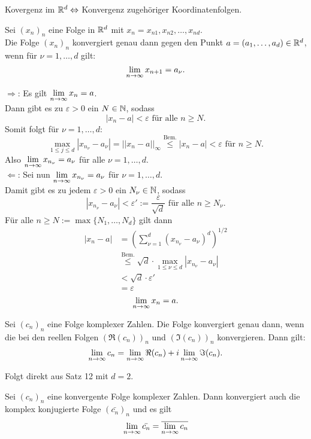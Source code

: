 \documentclass[../ana1.tex]{subfiles}
\begin{document}
Kovergenz im \(\mathbb{R}^d \Leftrightarrow\) Konvergenz zugehöriger Koordinatenfolgen.
\begin{satz}
	Sei \((x_n)_n\) eine Folge in \(\mathbb{R}^d\) mit \(x_n = x_{n1},x_{n2},\dots,x_{nd}\).\\
	Die Folge \((x_n)_n\) konvergiert genau dann gegen den Punkt \(a = (a_1,\dots,a_d)\in\mathbb{R}^d\), wenn für \(\nu = 1,\dots,d\) gilt:
	\[ \lim\limits_{n\rightarrow\infty} x_{n+1} = a_\nu. \]
\end{satz}
\begin{bew}
	\glqq\(\Rightarrow\)\grqq: Es gilt \( \lim\limits_{n\rightarrow\infty}x_n = a \).\\
	Dann gibt es zu \(\varepsilon>0\) ein \(N\in\mathbb{N}\), sodass
	\[ |x_n - a| < \varepsilon \text{ für alle } n\geq N. \]
	Somit folgt für \(\nu = 1,\dots,d\):
	\[ \underset{1\leq j\leq d}{\max} |x_{n_\nu} - a_\nu| = ||x_n - a||_\infty \overset{\text{Bem.}}{\leq} |x_n - a| < \varepsilon \text{ für }n\geq N. \]
	Also \(\lim\limits_{n\rightarrow\infty}x_{n_\nu} = a_\nu\) für alle \(\nu = 1,\dots,d\).\\
	\glqq\(\Leftarrow\)\grqq: Sei nun \( \lim\limits_{n\rightarrow\infty}x_{n_\nu} = a_\nu \) für \(\nu = 1,\dots,d\).\\
	Damit gibt es zu jedem \(\varepsilon>0\) ein \(N_\nu \in\mathbb{N}\), sodass
	\[ |x_{n_\nu} - a_\nu| < \varepsilon' := \frac{\varepsilon}{\sqrt{d}} \text{ für alle } n\geq N_\nu. \]
	Für alle \(n\geq N := \max\{N_1,\dots,N_d\}\) gilt dann
	\begin{align*}
		|x_n - a| &= {\left( \sum_{\nu=1}^{d} (x_{n_\nu} - a_\nu)^d \right)}^{1/2}\\
		&\overset{\text{Bem.}}{\leq} \sqrt{d} \cdot \underset{1\leq \nu\leq d}{\max} |x_{n_\nu} -a_\nu|\\
		&< \sqrt{d} \cdot \varepsilon'\\
		&= \varepsilon
	\end{align*}
	\[ \lim\limits_{n\rightarrow\infty} x_n = a. \]
\end{bew}
\begin{kor}
	Sei \((c_n)_n\) eine Folge komplexer Zahlen. Die Folge konvergiert genau dann, wenn die bei den reellen Folgen \((\Re(c_n))_n\) und \( (\Im(c_n))_n \) konvergieren. Dann gilt:
	\[ \lim\limits_{n\rightarrow\infty} c_n = \lim\limits_{n\rightarrow\infty} \Re(c_n) + i \lim\limits_{n\rightarrow\infty} \Im(c_n). \]
\end{kor}
\begin{bew}
	Folgt direkt aus Satz 12 mit \(d=2\).
\end{bew}
\begin{kor}
	Sei \((c_n)_n\) eine konvergente Folge komplexer Zahlen. Dann konvergiert auch die komplex konjugierte Folge \((\bar{c_n})_n\) und es gilt
	\[ \lim\limits_{n\rightarrow\infty} \bar{c_n} = \overline{ \lim\limits_{n\rightarrow\infty}c_n } \]
\end{kor}
\end{document}
